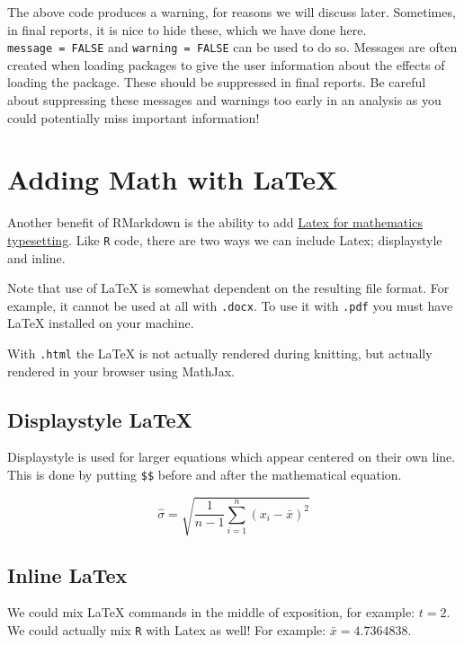 \documentclass[
]{book}
\begin{document}
The above code produces a warning, for reasons we will discuss later. Sometimes, in final reports, it is nice to hide these, which we have done here. \texttt{message\ =\ FALSE} and \texttt{warning\ =\ FALSE} can be used to do so. Messages are often created when loading packages to give the user information about the effects of loading the package. These should be suppressed in final reports. Be careful about suppressing these messages and warnings too early in an analysis as you could potentially miss important information!

\hypertarget{adding-math-with-latex}{%
\section{Adding Math with LaTeX}\label{adding-math-with-latex}}

Another benefit of RMarkdown is the ability to add \href{https://www.latex-project.org/about/}{Latex for mathematics typesetting}. Like \texttt{R} code, there are two ways we can include Latex; displaystyle and inline.

Note that use of LaTeX is somewhat dependent on the resulting file format. For example, it cannot be used at all with \texttt{.docx}. To use it with \texttt{.pdf} you must have LaTeX installed on your machine.

With \texttt{.html} the LaTeX is not actually rendered during knitting, but actually rendered in your browser using MathJax.

\hypertarget{displaystyle-latex}{%
\subsection{Displaystyle LaTeX}\label{displaystyle-latex}}

Displaystyle is used for larger equations which appear centered on their own line. This is done by putting \texttt{\$\$} before and after the mathematical equation.

\[
\widehat \sigma = \sqrt{\frac{1}{n - 1}\sum_{i=1}^{n}(x_i - \bar{x})^2}
\]

\hypertarget{inline-latex}{%
\subsection{Inline LaTex}\label{inline-latex}}

We could mix LaTeX commands in the middle of exposition, for example: \(t = 2\). We could actually mix \texttt{R} with Latex as well! For example: \(\bar{x} = 4.7364838\).
\end{document}
